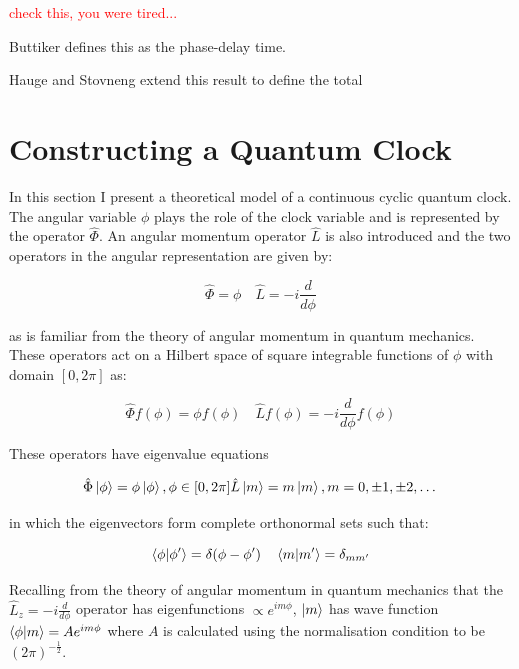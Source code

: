 \documentclass{article}
\begin{document}
\textcolor{red}{check this, you were tired...}

Buttiker defines this as the phase-delay time.

\noindent Hauge and Stovneng extend this result to define the total 







\section{Constructing a Quantum Clock}

In this section I present a theoretical model of a continuous cyclic quantum clock. The angular variable $\phi$ plays the role of the clock variable and is represented by the operator $\hat{\Phi}$. An angular momentum operator $\hat{L}$ is also introduced and the two operators in the angular representation are given by:

\begin{equation}
	\hat{\Phi} = \phi \quad \hat{L} = -i \frac{d}{d\phi}
\end{equation}

\noindent as is familiar from the theory of angular momentum in quantum mechanics. These operators act on a Hilbert space of square integrable functions of $\phi$ with domain $[0,2\pi]$ as:

\begin{equation}
	\hat{\Phi} f(\phi) = \phi f(\phi) \quad \hat{L} f(\phi) = -i \frac{d}{d\phi}f(\phi)
\end{equation}

These operators have eigenvalue equations 

\begin{equation}
	\hat{\Phi}\ket{\phi} = \phi\ket{\phi}, \phi \in [0,2\pi] \\
	\hat{L}\ket{m} = m\ket{m}, m = 0, \pm 1, \pm 2,\dots
\end{equation}

\noindent in which the eigenvectors form complete orthonormal sets such that:

\begin{equation}
	\braket{\phi|\phi'} = \delta(\phi-\phi ') \quad \braket{m|m'} = \delta_{mm'}
\end{equation}

\noindent Recalling from the theory of angular momentum in quantum mechanics that the $\hat{L}_z = -i \frac{d}{d\phi}$ operator has eigenfunctions $\propto e^{im\phi}$, $\ket{m}$ has wave function $\braket{\phi|m}= Ae^{im\phi}$ where $A$ is calculated using the normalisation condition to be $(2\pi)^{-\frac{1}{2}}$.
\end{document}
